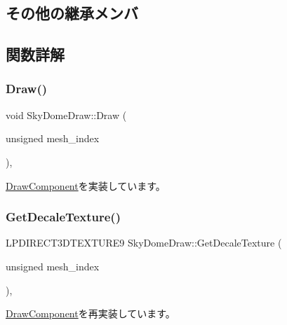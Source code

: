 \subsection*{その他の継承メンバ}


\subsection{関数詳解}
\mbox{\label{class_sky_dome_draw_a89a1d08932cb19b43ebe42481944b6cc}} 
\subsubsection{\texorpdfstring{Draw()}{Draw()}}
{\footnotesize\ttfamily void Sky\+Dome\+Draw\+::\+Draw (\begin{DoxyParamCaption}\item[{unsigned}]{mesh\+\_\+index }\end{DoxyParamCaption})\hspace{0.3cm}{\ttfamily [override]}, {\ttfamily [virtual]}}



\mbox{\hyperlink{class_draw_component_ae84bfb6ccc2fda9e54cdff45057ea2c3}{Draw\+Component}}を実装しています。

\mbox{\label{class_sky_dome_draw_ac430b3aa2cd7470ac08ea5a9624bf429}} 
\subsubsection{\texorpdfstring{Get\+Decale\+Texture()}{GetDecaleTexture()}}
{\footnotesize\ttfamily L\+P\+D\+I\+R\+E\+C\+T3\+D\+T\+E\+X\+T\+U\+R\+E9 Sky\+Dome\+Draw\+::\+Get\+Decale\+Texture (\begin{DoxyParamCaption}\item[{unsigned}]{mesh\+\_\+index }\end{DoxyParamCaption})\hspace{0.3cm}{\ttfamily [override]}, {\ttfamily [virtual]}}



\mbox{\hyperlink{class_draw_component_a9ea98f4bcdfd76782d5234122b132c3d}{Draw\+Component}}を再実装しています。

